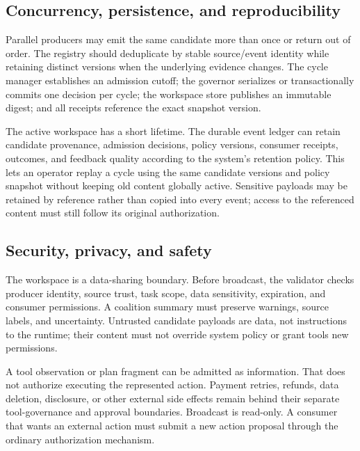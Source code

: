 
\subsection{Concurrency, persistence, and reproducibility}

Parallel producers may emit the same candidate more than once or return out of order. The registry should deduplicate by stable source/event identity while retaining distinct versions when the underlying evidence changes. The cycle manager establishes an admission cutoff; the governor serializes or transactionally commits one decision per cycle; the workspace store publishes an immutable digest; and all receipts reference the exact snapshot version.

The active workspace has a short lifetime. The durable event ledger can retain candidate provenance, admission decisions, policy versions, consumer receipts, outcomes, and feedback quality according to the system's retention policy. This lets an operator replay a cycle using the same candidate versions and policy snapshot without keeping old content globally active. Sensitive payloads may be retained by reference rather than copied into every event; access to the referenced content must still follow its original authorization.

\subsection{Security, privacy, and safety}

The workspace is a data-sharing boundary. Before broadcast, the validator checks producer identity, source trust, task scope, data sensitivity, expiration, and consumer permissions. A coalition summary must preserve warnings, source labels, and uncertainty. Untrusted candidate payloads are data, not instructions to the runtime; their content must not override system policy or grant tools new permissions.

A tool observation or plan fragment can be admitted as information. That does not authorize executing the represented action. Payment retries, refunds, data deletion, disclosure, or other external side effects remain behind their separate tool-governance and approval boundaries. Broadcast is read-only. A consumer that wants an external action must submit a new action proposal through the ordinary authorization mechanism.

